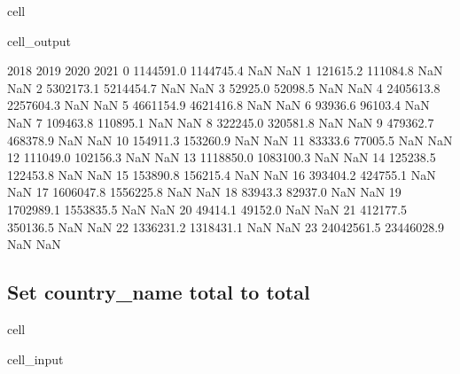 \documentclass[letterpaper,10pt,english]{jupyterBook}
\begin{document}
\begin{sphinxuseclass}{cell}
\begin{sphinxVerbatimOutput}
\begin{sphinxuseclass}{cell_output}
\begin{sphinxVerbatim}[commandchars=\\\{\}]
          2018        2019  2020  2021  
0    1144591.0   1144745.4   NaN   NaN  
1     121615.2    111084.8   NaN   NaN  
2    5302173.1   5214454.7   NaN   NaN  
3      52925.0     52098.5   NaN   NaN  
4    2405613.8   2257604.3   NaN   NaN  
5    4661154.9   4621416.8   NaN   NaN  
6      93936.6     96103.4   NaN   NaN  
7     109463.8    110895.1   NaN   NaN  
8     322245.0    320581.8   NaN   NaN  
9     479362.7    468378.9   NaN   NaN  
10    154911.3    153260.9   NaN   NaN  
11     83333.6     77005.5   NaN   NaN  
12    111049.0    102156.3   NaN   NaN  
13   1118850.0   1083100.3   NaN   NaN  
14    125238.5    122453.8   NaN   NaN  
15    153890.8    156215.4   NaN   NaN  
16    393404.2    424755.1   NaN   NaN  
17   1606047.8   1556225.8   NaN   NaN  
18     83943.3     82937.0   NaN   NaN  
19   1702989.1   1553835.5   NaN   NaN  
20     49414.1     49152.0   NaN   NaN  
21    412177.5    350136.5   NaN   NaN  
22   1336231.2   1318431.1   NaN   NaN  
23  24042561.5  23446028.9   NaN   NaN  
\end{sphinxVerbatim}

\end{sphinxuseclass}\end{sphinxVerbatimOutput}

\end{sphinxuseclass}

\subsection{Set country\_name total to total}
\label{\detokenize{notebooks/data_exploration:set-country-name-total-to-total}}
\begin{sphinxuseclass}{cell}\begin{sphinxVerbatimInput}

\begin{sphinxuseclass}{cell_input}
\begin{sphinxVerbatim}[commandchars=\\\{\}]
\PYG{p}{[}\PYG{p}{]}  
\end{sphinxVerbatim}

\end{sphinxuseclass}\end{sphinxVerbatimInput}

\end{sphinxuseclass}
\end{document}
